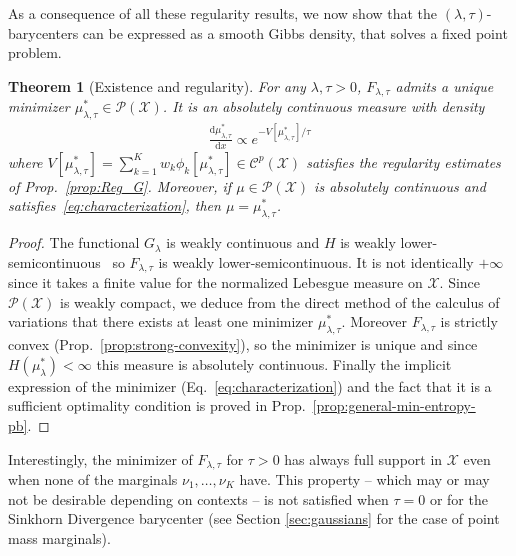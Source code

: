 \documentclass[11pt]{article}
\newcommand{\rev}[1]{{#1}}
\newcommand{\RR}{\mathbb{R}}
\newcommand{\Cc}{\mathcal{C}}
\newcommand{\Pp}{\mathcal{P}}
\newcommand{\Xx}{\mathcal{X}}
\renewcommand{\d}{\mathrm{d}}
\newtheorem{theorem}{Theorem}[section]
\begin{document}
As a consequence of all these regularity results, we now show that the $(\lambda,\tau)$-barycenters can be expressed as a smooth Gibbs density, that solves a fixed point problem.
\begin{assbox}
\begin{theorem}[Existence and regularity]\label{thm:characterization}
For any $\lambda,\tau > 0$, $F_{\lambda,\tau}$ admits a unique minimizer $\mu^*_{\lambda,\tau} \in \Pp(\Xx)$. It is an absolutely continuous measure with density
\begin{align}\label{eq:characterization}
\frac{\d \mu^*_{\lambda,\tau}}{\d x} \propto  e^{-V[\mu^*_{\lambda,\tau}]/\tau} 
\end{align}
where $V[\mu^*_{\lambda,\tau}]=\sum_{k=1}^K w_k \phi_k[\mu^*_{\lambda,\tau}] \in \Cc^{p}(\Xx)$ satisfies the regularity estimates of Prop.~\ref{prop:Reg_G}. \rev{Moreover, if $\mu\in \Pp(\Xx)$ is absolutely continuous and satisfies~\eqref{eq:characterization}, then $\mu=\mu^*_{\lambda,\tau}$.}
\end{theorem}
\end{assbox}
\begin{proof}
The functional $G_\lambda$ is weakly continuous and $H$ is weakly lower-semicontinuous~\cite[Sec.~7.1.2]{santambrogio2015optimal} so $F_{\lambda,\tau}$ is weakly lower-semicontinuous. It is not identically $+\infty$ since it takes a finite value for the normalized Lebesgue measure on $\Xx$. Since $\Pp(\Xx)$ is weakly compact, we deduce from the direct method of the calculus of variations that there exists at least one minimizer $\mu^*_{\lambda,\tau}$. Moreover $F_{\lambda,\tau}$ is strictly convex (Prop.~\ref{prop:strong-convexity}), so the minimizer is unique and since $H(\mu^*_\lambda)<\infty$ this measure is absolutely continuous. \rev{Finally the implicit expression of the minimizer (Eq.~\eqref{eq:characterization}) and the fact that it is a sufficient optimality condition is proved in Prop.~\ref{prop:general-min-entropy-pb}.} %
\end{proof}
Interestingly, the minimizer of $F_{\lambda,\tau}$ for $\tau>0$ has always full support in $\Xx$ even when none of the marginals $\nu_1,\dots,\nu_K$ have. This property \rev{-- which may or may not be desirable depending on contexts --} is not satisfied when $\tau=0$ or for the Sinkhorn Divergence barycenter (see Section \ref{sec:gaussians} for the case of point mass marginals). 
\end{document}
